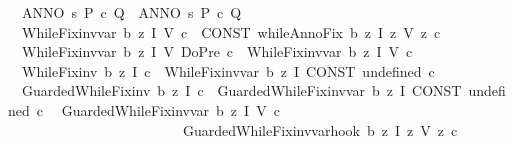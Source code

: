 \begin{isabellebody}
\ \ {\isachardoublequoteopen}ANNO\ s{\isachardot}\ P\ c\ Q{\isachardoublequoteclose}\ {\isacharequal}{\isacharequal}\ {\isachardoublequoteopen}ANNO\ s{\isachardot}\ P\ c\ Q{\isacharcomma}{\isacharbraceleft}{\isacharbraceright}{\isachardoublequoteclose}\isanewline
\isanewline
\ \ {\isachardoublequoteopen}{\isacharunderscore}WhileFix{\isacharunderscore}inv{\isacharunderscore}var\ b\ z\ I\ V\ c{\isachardoublequoteclose}\ {\isacharequal}{\isachargreater}\ {\isachardoublequoteopen}CONST\ whileAnnoFix\ {\isacharbraceleft}{\isacharbar}b{\isacharbar}{\isacharbraceright}\ {\isacharparenleft}{\isasymlambda}z{\isachardot}\ I{\isacharparenright}\ {\isacharparenleft}{\isasymlambda}z{\isachardot}\ V{\isacharparenright}\ {\isacharparenleft}{\isasymlambda}z{\isachardot}\ c{\isacharparenright}{\isachardoublequoteclose}\isanewline
\ \ {\isachardoublequoteopen}{\isacharunderscore}WhileFix{\isacharunderscore}inv{\isacharunderscore}var\ b\ z\ I\ V\ {\isacharparenleft}{\isacharunderscore}DoPre\ c{\isacharparenright}{\isachardoublequoteclose}\ {\isacharless}{\isacharequal}\ {\isachardoublequoteopen}{\isacharunderscore}WhileFix{\isacharunderscore}inv{\isacharunderscore}var\ {\isacharbraceleft}{\isacharbar}b{\isacharbar}{\isacharbraceright}\ z\ I\ V\ c{\isachardoublequoteclose}\isanewline
\ \ {\isachardoublequoteopen}{\isacharunderscore}WhileFix{\isacharunderscore}inv\ b\ z\ I\ c{\isachardoublequoteclose}\ {\isacharequal}{\isacharequal}\ {\isachardoublequoteopen}{\isacharunderscore}WhileFix{\isacharunderscore}inv{\isacharunderscore}var\ b\ z\ I\ {\isacharparenleft}CONST\ undefined{\isacharparenright}\ c{\isachardoublequoteclose}\isanewline
\isanewline
\ \ {\isachardoublequoteopen}{\isacharunderscore}GuardedWhileFix{\isacharunderscore}inv\ b\ z\ I\ c{\isachardoublequoteclose}\ {\isacharequal}{\isacharequal}\ {\isachardoublequoteopen}{\isacharunderscore}GuardedWhileFix{\isacharunderscore}inv{\isacharunderscore}var\ b\ z\ I\ {\isacharparenleft}CONST\ undefined{\isacharparenright}\ c{\isachardoublequoteclose}\isanewline
\isanewline
\ \ {\isachardoublequoteopen}{\isacharunderscore}GuardedWhileFix{\isacharunderscore}inv{\isacharunderscore}var\ b\ z\ I\ V\ c{\isachardoublequoteclose}\ {\isacharequal}{\isachargreater}\isanewline
\ \ \ \ \ \ \ \ \ \ \ \ \ \ \ \ \ \ \ \ \ \ \ \ \ {\isachardoublequoteopen}{\isacharunderscore}GuardedWhileFix{\isacharunderscore}inv{\isacharunderscore}var{\isacharunderscore}hook\ {\isacharbraceleft}{\isacharbar}b{\isacharbar}{\isacharbraceright}\ {\isacharparenleft}{\isasymlambda}z{\isachardot}\ I{\isacharparenright}\ {\isacharparenleft}{\isasymlambda}z{\isachardot}\ V{\isacharparenright}\ {\isacharparenleft}{\isasymlambda}z{\isachardot}\ c{\isacharparenright}{\isachardoublequoteclose}\isanewline

\end{isabellebody}
